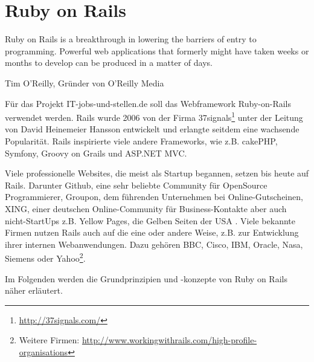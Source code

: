\newpage

\section{Ruby on Rails}
\label{sec:rails}
\epigraph{Ruby on Rails is a breakthrough in lowering the barriers of entry to programming. Powerful web applications that formerly might have taken weeks or months to develop can be produced in a matter of days.}{Tim O'Reilly, Gründer von O'Reilly Media}


Für das Projekt IT-jobs-und-stellen.de soll das Webframework Ruby-on-Rails verwendet werden. Rails wurde 2006 von der Firma 37signals\footnote{\url{http://37signals.com/}} unter der Leitung von David Heinemeier Hansson entwickelt und erlangte seitdem eine wachsende Popularität. Rails inspirierte viele andere Frameworks, wie z.B. cakePHP, Symfony, Groovy on Grails und ASP.NET MVC.

Viele professionelle Websites, die meist als Startup begannen, setzen bis heute auf Rails. Darunter Github, eine sehr beliebte Community für OpenSource Programmierer,  Groupon, dem führenden Unternehmen bei Online-Gutscheinen, XING, einer deutschen Online-Community für Business-Kontakte aber auch nicht-StartUps z.B. Yellow Pages, die Gelben Seiten der USA \citep{ruby_on_rails_2011}. Viele bekannte Firmen nutzen Rails auch auf die eine oder andere Weise, z.B. zur Entwicklung ihrer internen Webanwendungen. Dazu gehören BBC, Cisco, IBM, Oracle, Nasa, Siemens oder Yahoo\footnote{Weitere Firmen: \url{http://www.workingwithrails.com/high-profile-organisations}}.

Im Folgenden werden die Grundprinzipien und -konzepte von Ruby on Rails näher erläutert.

